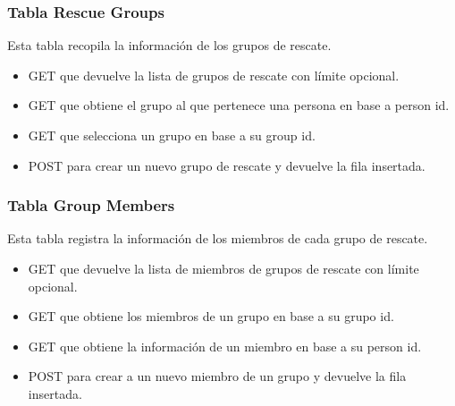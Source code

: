     \subsubsection{Tabla Rescue Groups}
        Esta tabla recopila la información de los grupos de rescate.
        \begin{itemize}
            \item GET que devuelve la lista de grupos de rescate con límite opcional.
            \item GET que obtiene el grupo al que pertenece una persona en base a person id. 
            \item GET que selecciona un grupo en base a su group id.
            \item POST para crear un nuevo grupo de rescate y devuelve la fila insertada.
        \end{itemize}

    \subsubsection{Tabla Group Members}
        Esta tabla registra la información de los miembros de cada grupo de rescate.
        \begin{itemize}
            \item GET que devuelve la lista de miembros de grupos de rescate con límite opcional.
            \item GET que obtiene los miembros de un grupo en base a su grupo id.
            \item GET que obtiene la información de un miembro en base a su person id.
            \item POST para crear a un nuevo miembro de un grupo y devuelve la fila insertada.
        \end{itemize}
